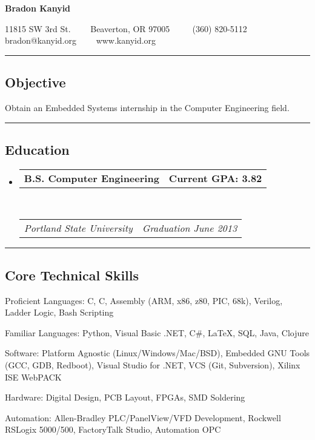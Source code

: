 \documentclass[10pt,letterpaper]{article}
\makeatletter
\newenvironment{indentsection}[1]%
{\begin{list}{}%
	{\setlength{\leftmargin}{#1}}%
	\item[]%
}
{\end{list}}
\newcommand{\headerrow}[2]
{\begin{tabular*}{\linewidth}{l@{\extracolsep{\fill}}r}
	#1 &
	#2 \\
\end{tabular*}}
\newcommand{\CPP}
{C\nolinebreak[4]\hspace{-.05em}\raisebox{.22ex}{\footnotesize\bf ++}}
\makeatother
\begin{document}
\begin{center}
{\LARGE \textbf{Bradon Kanyid}}

11815 SW 3rd St.\ \ \textbullet
\ \ Beaverton, OR 97005 \ \ \textbullet
\ \ (360) 820-5112\\
bradon@kanyid.org\ \ \textbullet
\ \ www.kanyid.org
\end{center}

\hrule
\vspace{-0.4em}
\subsection*{Objective}
\begin{indentsection}{\parindent}
\begin{description*}
	\item Obtain an Embedded Systems internship in the Computer Engineering field.
\end{description*}
\end{indentsection}
\vspace{1em}

\hrule
\vspace{-0.4em}
\subsection*{Education}

\begin{itemize}
	\parskip=0.1em

	\item 
	\headerrow
                {\textbf{B.S. Computer Engineering}}
		{\textbf{Current GPA: 3.82}}
	\\
	\headerrow
		{\emph{Portland State University}}
		{\emph{Graduation June 2013}}
\end{itemize}
\vspace{1em}


\hrule
\vspace{-0.4em}
\subsection*{Core Technical Skills}

\begin{indentsection}{\parindent}
\begin{description*}
	\item[Proficient Languages:]
    C, \CPP, Assembly (ARM, x86, z80, PIC, 68k), Verilog, Ladder Logic, Bash Scripting 
	\item[Familiar Languages:]
    Python, Visual Basic .NET, C\#, \LaTeX, SQL, Java, Clojure 
	\item[Software:]
    Platform Agnostic (Linux/Windows/Mac/BSD), Embedded GNU Tools (GCC, GDB, Redboot), Visual Studio for .NET, VCS (Git, Subversion), Xilinx ISE WebPACK
	\item[Hardware:]
    Digital Design, PCB Layout, FPGAs, SMD Soldering 
	\item[Automation:]
    Allen-Bradley PLC/PanelView/VFD Development, Rockwell RSLogix 5000/500, FactoryTalk Studio, Automation OPC 	
\end{description*}
\end{indentsection}
\vspace{1em}
\end{document}
